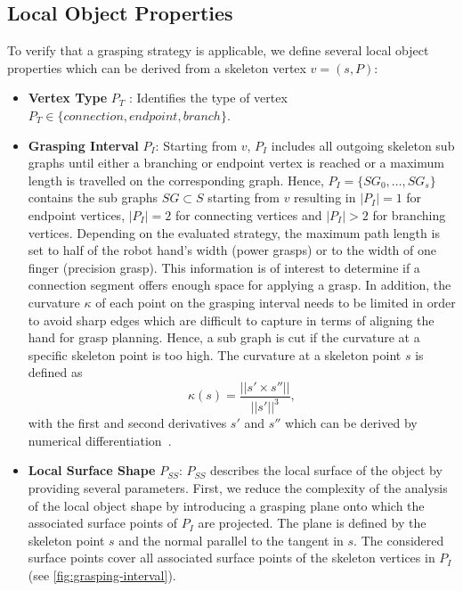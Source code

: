 \subsection{Local Object Properties}

To verify that a grasping strategy is applicable, we define several local object properties which can be derived from a skeleton vertex $v = (s,P)$:

\begin{itemize}
\item \textbf{Vertex Type} $P_T$ : Identifies the type of vertex $P_T \in \{connection, endpoint, branch\}$. 
\item \textbf{Grasping Interval} $P_I$: Starting from $v$, $P_I$ includes all outgoing skeleton sub graphs until either a branching or endpoint vertex is reached or a maximum length is travelled on the corresponding graph. Hence, $P_I = \{SG_0, \ldots, SG_s\}$ contains the sub graphs $SG \subset S$ starting from $v$ resulting in $|P_I| = 1$ for endpoint vertices, $|P_I| = 2$ for connecting vertices and $|P_I| > 2$ for branching vertices. Depending on the evaluated strategy, the maximum path length is set to half of the robot hand's width (power grasps) or to the width of one finger (precision grasp).
This information is of interest to determine if a connection segment offers enough space for applying a grasp.
%
In addition, the curvature $\kappa$ of each point on the grasping interval needs to be limited in order to avoid sharp edges which are difficult to capture in terms of aligning the hand for grasp planning. Hence, a sub graph is cut if the curvature at a specific skeleton point is too high.
The curvature at a skeleton point $s$ is defined as
\begin{equation*}
\kappa(s) = \frac{|| s' \times s'' ||}{||s' ||^3},
\end{equation*}
with the first and second derivatives $s'$ and $s''$ which can be derived by numerical differentiation~\cite{casey1996exploring}. 

\item \textbf{Local Surface Shape} $P_{SS}$: $P_{SS}$ describes the local surface of the object by providing several parameters. First, we reduce the complexity of the analysis of the local object shape by introducing a grasping plane onto which the associated surface points of $P_I$ are projected. The plane is defined by the skeleton point $s$ and the normal parallel to the tangent in $s$.
The considered surface points cover all associated surface points of the skeleton vertices in $P_I$ (see \autoref{fig:grasping-interval}).


\end{itemize}
